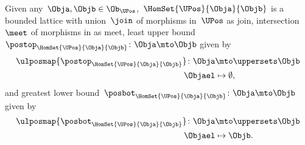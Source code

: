 \begin{lemma}
\label{lem:UPos-is-bounded-lattice}
Given any~$\Obja,\Objb\in \Ob_\UPos$,~$\HomSet{\UPos}{\Obja}{\Objb}$ is a bounded lattice with union~$\join$ of morphisms in~$\UPos$ as join, intersection~$\meet$ of morphisms in \UPos as meet, least upper bound~$\postop_{\HomSet{\UPos}{\Obja}{\Objb}}\colon \Obja \mto \Objb$ given by
\begin{equation*}
\begin{aligned}
\ulposmap{\postop_{\HomSet{\UPos}{\Obja}{\Objb}}}\colon \Obja &\mto \uppersets \Objb\\
\Objael &\mapsto \emptyset,
\end{aligned}
\end{equation*}
and greatest lower bound~$\posbot_{\HomSet{\UPos}{\Obja}{\Objb}}\colon \Obja \mto \Objb$ given by
\begin{equation*}
\begin{aligned}
\ulposmap{\posbot_{\HomSet{\UPos}{\Obja}{\Objb}}}\colon \Obja &\mto \uppersets \Objb\\
\Objael &\mapsto \Objb.
\end{aligned}
\end{equation*}
\end{lemma}
